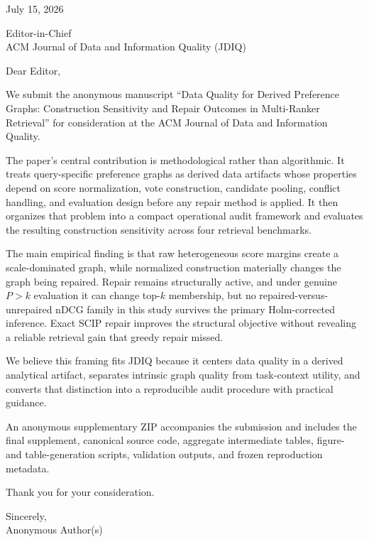 \documentclass[11pt]{article}
\begin{document}
\begin{flushright}
July 15, 2026
\end{flushright}

Editor-in-Chief\\
ACM Journal of Data and Information Quality (JDIQ)

\vspace{1em}

Dear Editor,

We submit the anonymous manuscript ``Data Quality for Derived Preference
Graphs: Construction Sensitivity and Repair Outcomes in Multi-Ranker
Retrieval'' for consideration at the ACM Journal of Data and Information
Quality.

The paper's central contribution is methodological rather than algorithmic.
It treats query-specific preference graphs as derived data artifacts whose
properties depend on score normalization, vote construction, candidate
pooling, conflict handling, and evaluation design before any repair method
is applied. It then organizes that problem into a compact operational audit
framework and evaluates the resulting construction sensitivity across four
retrieval benchmarks.

The main empirical finding is that raw heterogeneous score margins create a
scale-dominated graph, while normalized construction materially changes the
graph being repaired. Repair remains structurally active, and under genuine
$P > k$ evaluation it can change top-$k$ membership, but no repaired-versus-
unrepaired nDCG family in this study survives the primary Holm-corrected
inference. Exact SCIP repair improves the structural objective without
revealing a reliable retrieval gain that greedy repair missed.

We believe this framing fits JDIQ because it centers data quality in a
derived analytical artifact, separates intrinsic graph quality from
task-context utility, and converts that distinction into a reproducible
audit procedure with practical guidance.

An anonymous supplementary ZIP accompanies the submission and includes the
final supplement, canonical source code, aggregate intermediate tables,
figure- and table-generation scripts, validation outputs, and frozen
reproduction metadata.

Thank you for your consideration.

\vspace{1em}

Sincerely,\\
Anonymous Author(s)
\end{document}
